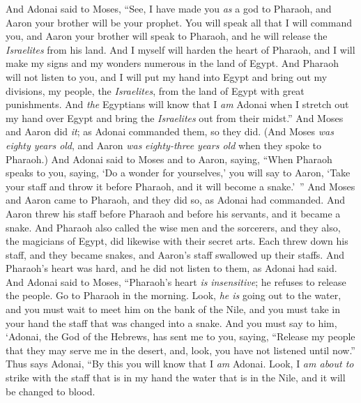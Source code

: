 \begin{biblechapter} %
 And Adonai said to Moses, “See, I have made you \textit{as} a god to Pharaoh, and Aaron your brother will be your prophet.
\verse You will speak all that I will command you, and Aaron your brother will speak to Pharaoh, and he will release the \textit{Israelites} from his land.
\verse And I myself will harden the heart of Pharaoh, and I will make my signs and my wonders numerous in the land of Egypt.
\verse And Pharaoh will not listen to you, and I will put my hand into Egypt and bring out my divisions, my people, the \textit{Israelites}, from the land of Egypt with great punishments.
\verse And \textit{the} Egyptians will know that I \textit{am} Adonai when I stretch out my hand over Egypt and bring the \textit{Israelites} out from their midst.”
\verse And Moses and Aaron did \textit{it}; as Adonai commanded them, so they did.
\verse (And Moses \textit{was} \textit{eighty years old}, and Aaron \textit{was} \textit{eighty-three years old} when they spoke to Pharaoh.)
 And Adonai said to Moses and to Aaron, saying,
\verse “When Pharaoh speaks to you, saying, ‘Do a wonder for yourselves,’ you will say to Aaron, ‘Take your staff and throw it before Pharaoh, and it will become a snake.’ ”
\verse And Moses and Aaron came to Pharaoh, and they did so, as Adonai had commanded. And Aaron threw his staff before Pharaoh and before his servants, and it became a snake.
\verse And Pharaoh also called the wise men and the sorcerers, and they also, the magicians of Egypt, did likewise with their secret arts.
\verse Each threw down his staff, and they became snakes, and Aaron’s staff swallowed up their staffs.
\verse And Pharaoh’s heart was hard, and he did not listen to them, as Adonai had said.
 And Adonai said to Moses, “Pharaoh’s heart \textit{is} \textit{insensitive}; he refuses to release the people.
\verse Go to Pharaoh in the morning. Look, \textit{he is} going out to the water, and you must wait to meet him on the bank of the Nile, and you must take in your hand the staff that was changed into a snake.
\verse And you must say to him, ‘Adonai, the God of the Hebrews, has sent me to you, saying, “Release my people that they may serve me in the desert, and, look, you have not listened until now.”
\verse Thus says Adonai, “By this you will know that I \textit{am} Adonai. Look, I \textit{am about to} strike with the staff that is in my hand the water that is in the Nile, and it will be changed to blood.

\end{biblechapter}
